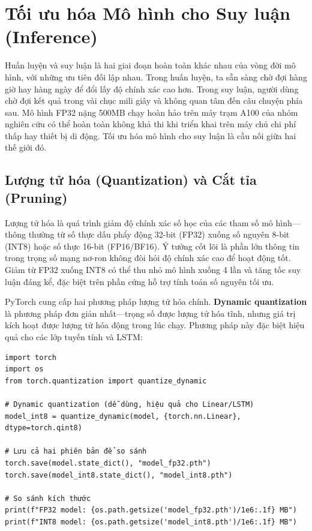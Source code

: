 \section{Tối ưu hóa Mô hình cho Suy luận (Inference)}
\label{sec:model_optimization}

Huấn luyện và suy luận là hai giai đoạn hoàn toàn khác nhau của vòng đời mô hình, với những ưu tiên đối lập nhau. Trong huấn luyện, ta sẵn sàng chờ đợi hàng giờ hay hàng ngày để đổi lấy độ chính xác cao hơn. Trong suy luận, người dùng chờ đợi kết quả trong vài chục mili giây và không quan tâm đến câu chuyện phía sau. Mô hình FP32 nặng 500MB chạy hoàn hảo trên máy trạm A100 của nhóm nghiên cứu có thể hoàn toàn không khả thi khi triển khai trên máy chủ chi phí thấp hay thiết bị di động. Tối ưu hóa mô hình cho suy luận là cầu nối giữa hai thế giới đó.

\subsection{Lượng tử hóa (Quantization) và Cắt tỉa (Pruning)}
\label{subsec:quantization_pruning}

Lượng tử hóa là quá trình giảm độ chính xác số học của các tham số mô hình---thông thường từ số thực dấu phẩy động 32-bit (FP32) xuống số nguyên 8-bit (INT8) hoặc số thực 16-bit (FP16/BF16). Ý tưởng cốt lõi là phần lớn thông tin trong trọng số mạng nơ-ron không đòi hỏi độ chính xác cao để hoạt động tốt. Giảm từ FP32 xuống INT8 có thể thu nhỏ mô hình xuống 4 lần và tăng tốc suy luận đáng kể, đặc biệt trên phần cứng hỗ trợ tính toán số nguyên tối ưu.

PyTorch cung cấp hai phương pháp lượng tử hóa chính. \textbf{Dynamic quantization} là phương pháp đơn giản nhất---trọng số được lượng tử hóa tĩnh, nhưng giá trị kích hoạt được lượng tử hóa động trong lúc chạy. Phương pháp này đặc biệt hiệu quả cho các lớp tuyến tính và LSTM:

\begin{verbatim}
import torch
import os
from torch.quantization import quantize_dynamic

# Dynamic quantization (dễ dùng, hiệu quả cho Linear/LSTM)
model_int8 = quantize_dynamic(model, {torch.nn.Linear}, dtype=torch.qint8)

# Lưu cả hai phiên bản để so sánh
torch.save(model.state_dict(), "model_fp32.pth")
torch.save(model_int8.state_dict(), "model_int8.pth")

# So sánh kích thước
print(f"FP32 model: {os.path.getsize('model_fp32.pth')/1e6:.1f} MB")
print(f"INT8 model: {os.path.getsize('model_int8.pth')/1e6:.1f} MB")
\end{verbatim}

